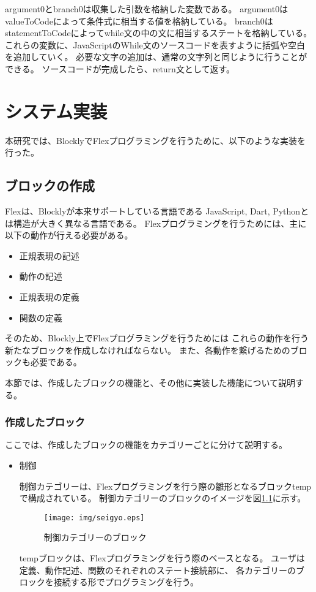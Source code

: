 \documentclass{risepaper}
\begin{document}
argument0とbranch0は収集した引数を格納した変数である。
argument0はvalueToCodeによって条件式に相当する値を格納している。
branch0はstatementToCodeによってwhile文の中の文に相当するステートを格納している。
これらの変数に、JavaScriptのWhile文のソースコードを表すように括弧や空白を追加していく。
必要な文字の追加は、通常の文字列と同じように行うことができる。
ソースコードが完成したら、return文として返す。


\chapter{システム実装}

本研究では、BlocklyでFlexプログラミングを行うために、以下のような実装を行った。

\section{ブロックの作成}

Flexは、Blocklyが本来サポートしている言語である
JavaScript, Dart, Pythonとは構造が大きく異なる言語である。
Flexプログラミングを行うためには、主に以下の動作が行える必要がある。

\begin{itemize}
\item 正規表現の記述
\item 動作の記述
\item 正規表現の定義
\item 関数の定義
\end{itemize}

そのため、Blockly上でFlexプログラミングを行うためには
これらの動作を行う新たなブロックを作成しなければならない。
また、各動作を繋げるためのブロックも必要である。

本節では、作成したブロックの機能と、その他に実装した機能について説明する。

\subsection{作成したブロック}

ここでは、作成したブロックの機能をカテゴリーごとに分けて説明する。

\begin{itemize}
\item 制御

制御カテゴリーは、Flexプログラミングを行う際の雛形となるブロックtempで構成されている。
制御カテゴリーのブロックのイメージを図\ref{fig:seigyo}に示す。

\begin{figure}[h]
\begin{center}
\texttt{[image: img/seigyo.eps]}
\end{center}%
\caption{制御カテゴリーのブロック}%
\label{fig:seigyo}
\end{figure}%

tempブロックは、Flexプログラミングを行う際のベースとなる。
ユーザは定義、動作記述、関数のそれぞれのステート接続部に、
各カテゴリーのブロックを接続する形でプログラミングを行う。

\end{itemize}
\end{document}
